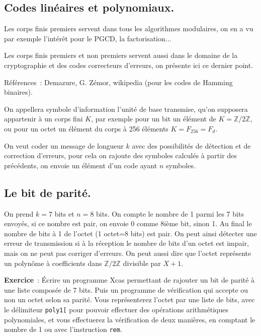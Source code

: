 \documentclass[a4paper,11pt]{book}
\begin{document}
\begin{giacjshere}
\pagebreak

\section{Codes lin\'eaires et polynomiaux.}
 
Les corps finis premiers servent dans tous les algorithmes modulaires,
on en a vu par exemple l'int\'er\^et pour le PGCD, la factorisation...

Les corps finis premiers et non premiers servent aussi dans le
domaine de la cryptographie et des codes correcteurs d'erreurs, 
on pr\'esente ici ce dernier point.

R\'ef\'erences~: Demazure, G. Z\'emor, wikipedia (pour les codes de
Hamming binaires).
 
On appellera symbole d'information l'unit\'e de base transmise, qu'on
supposera appartenir à un corps fini $K$, par
exemple pour un bit un élément de $K=\mathbb{Z}/2\mathbb{Z}$, ou pour un octet 
un \'el\'ement du corps à 256 éléments $K=F_{256}=F_d$.

On veut coder un message de longueur $k$ avec des possibilit\'es
de d\'etection et de correction d'erreurs, pour cela on rajoute
des symboles calcul\'es \`a partir des pr\'ec\'edents, 
on envoie un \'el\'ement d'un code ayant $n$ symboles.

\subsection{Le bit de parit\'e.}
On prend $k=7$ bits et $n=8$ bits. On compte
le nombre de 1 parmi les 7 bits envoy\'es, si ce nombre est pair, 
on envoie 0 comme 8i\`eme bit, sinon 1. 
Au final le nombre de bits \`a 1 de l'octet (1 octet=8 bits)
est pair. On peut ainsi d\'etecter une erreur de transmission si
\`a la r\'eception le nombre de bits d'un octet est impair, mais on
ne peut pas corriger d'erreurs.
On peut aussi dire que l'octet
repr\'esente un polyn\^ome \`a coefficients dans $\mathbb{Z}/2\mathbb{Z}$ divisible
par $X+1$.

{\bf Exercice}~:
\'Ecrire un programme Xcas permettant de rajouter un bit de parité
à une liste composée de 7 bits. Puis un programme de vérification
qui accepte ou non un octet selon sa parité. Vous représenterez
l'octet par une liste de bits, avec le délimiteur \verb|poly1[|
pour pouvoir effectuer des opérations arithmétiques polynomiales,
et vous effectuerez la vérification de deux manières, en comptant
le nombre de 1 ou avec l'instruction \verb|rem|.


\end{giacjshere}
\end{document}
